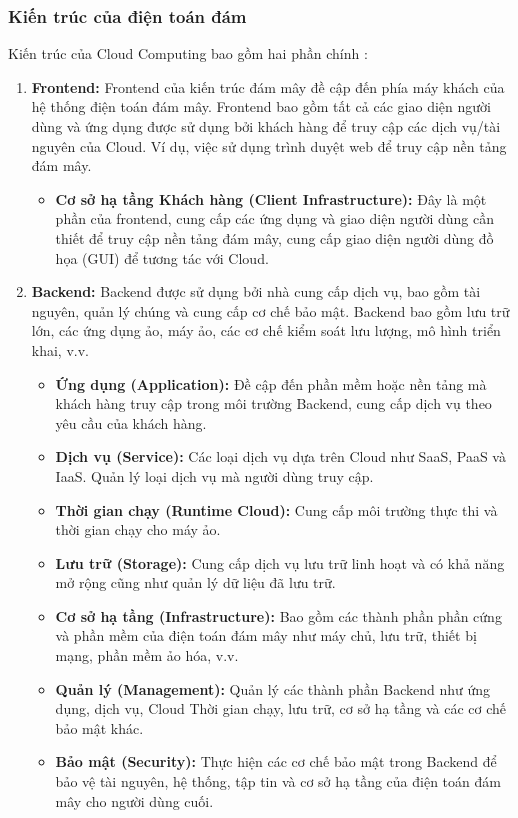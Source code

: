 \subsubsection{Kiến trúc của điện toán đám }
Kiến trúc của Cloud Computing bao gồm hai phần chính \cite{geeksforgeeks}:
\begin{enumerate}
\item \textbf{Frontend:}
Frontend của kiến trúc đám mây đề cập đến phía máy khách của hệ thống điện toán đám mây. Frontend bao gồm tất cả các giao diện người dùng và ứng dụng được sử dụng bởi khách hàng để truy cập các dịch vụ/tài nguyên của Cloud. Ví dụ, việc sử dụng trình duyệt web để truy cập nền tảng đám mây.
    \begin{itemize}
        \item \textbf{Cơ sở hạ tầng Khách hàng (Client Infrastructure):} Đây là một phần của frontend, cung cấp các ứng dụng và giao diện người dùng cần thiết để truy cập nền tảng đám mây, cung cấp giao diện người dùng đồ họa (GUI) để tương tác với Cloud.
    \end{itemize}
    
\item \textbf{Backend:}
    Backend được sử dụng bởi nhà cung cấp dịch vụ, bao gồm tài nguyên, quản lý chúng và cung cấp cơ chế bảo mật. Backend bao gồm lưu trữ lớn, các ứng dụng ảo, máy ảo, các cơ chế kiểm soát lưu lượng, mô hình triển khai, v.v.
    \begin{itemize}
        \item \textbf{Ứng dụng (Application):} Đề cập đến phần mềm hoặc nền tảng mà khách hàng truy cập trong môi trường Backend, cung cấp dịch vụ theo yêu cầu của khách hàng.
        \item \textbf{Dịch vụ (Service):} Các loại dịch vụ dựa trên Cloud như SaaS, PaaS và IaaS. Quản lý loại dịch vụ mà người dùng truy cập.
        \item \textbf{Thời gian chạy (Runtime Cloud):} Cung cấp môi trường thực thi và thời gian chạy cho máy ảo.
        \item \textbf{Lưu trữ (Storage):} Cung cấp dịch vụ lưu trữ linh hoạt và có khả năng mở rộng cũng như quản lý dữ liệu đã lưu trữ.
        \item \textbf{Cơ sở hạ tầng (Infrastructure):} Bao gồm các thành phần phần cứng và phần mềm của điện toán đám mây như máy chủ, lưu trữ, thiết bị mạng, phần mềm ảo hóa, v.v.
        \item \textbf{Quản lý (Management):} Quản lý các thành phần Backend như ứng dụng, dịch vụ, Cloud Thời gian chạy, lưu trữ, cơ sở hạ tầng và các cơ chế bảo mật khác.
        \item \textbf{Bảo mật (Security):} Thực hiện các cơ chế bảo mật trong Backend để bảo vệ tài nguyên, hệ thống, tập tin và cơ sở hạ tầng của điện toán đám mây cho người dùng cuối.
    \end{itemize}
\end{enumerate}
